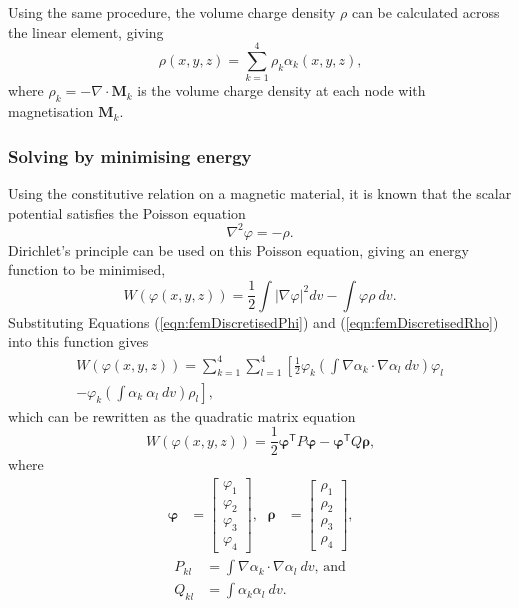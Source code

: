 Using the same procedure, the volume charge density \(\rho\) can be calculated across the linear element, giving
\begin{equation}\label{eqn:femDiscretisedRho}
    \rho\left(x,y,z\right) = \sum_{k = 1}^4 \rho_k \alpha_k\left(x,y,z\right) \text{,}
\end{equation}
where \(\rho_k = -\nabla \cdot \mathbf{M}_k\) is the volume charge density at each node with magnetisation \(\mathbf{M}_k\).

\subsubsection*{Solving by minimising energy}
Using the constitutive relation on a magnetic material, it is known that the scalar potential satisfies the Poisson equation
\begin{equation}
    \nabla ^2 \varphi = -\rho \text{.}
\end{equation}
Dirichlet's principle can be used on this Poisson equation, giving an energy function to be minimised,
\begin{equation}
    W\left(\varphi\left(x,y,z\right)\right) = \frac{1}{2} \int \left| \nabla \varphi \right|^2 dv - \int \varphi \rho \ dv \text{.}
\end{equation}
Substituting Equations (\ref{eqn:femDiscretisedPhi}) and (\ref{eqn:femDiscretisedRho}) into this function gives
\begin{align}
    W\left(\varphi\left(x,y,z\right)\right) = \sum_{k = 1}^4 \sum_{l = 1}^4 \left[ \frac{1}{2} \varphi_k \left( \int \nabla \alpha_k \cdot \nabla \alpha_l \ dv \right) \varphi_l \right. \nonumber \\
    \left. - \varphi_k \left( \int \alpha_k \ \alpha_l \ dv \right) \rho_l \right] \text{,}
\end{align}
which can be rewritten as the quadratic matrix equation
\begin{equation}\label{eqn:femQuadMatEqn}
    W\left(\varphi\left(x,y,z\right)\right) = \frac{1}{2}\bm{\varphi}^\mathsf{T} P \bm{\varphi} - \bm{\varphi}^\mathsf{T} Q \bm{\rho} \text{,}
\end{equation}
where
\begin{align*}
    \bm{\varphi} &= \begin{bmatrix} \varphi_1 \\ \varphi_2 \\ \varphi_3 \\ \varphi_4 \end{bmatrix} \text{,} &
    \bm{\rho} &= \begin{bmatrix} \rho_1 \\ \rho_2 \\ \rho_3 \\ \rho_4 \end{bmatrix} \text{,}
\end{align*}
\begin{align*}
    P_{kl} &= \int \nabla \alpha_k \cdot \nabla \alpha_l \ dv \text{, and} \\
    Q_{kl} &= \int \alpha_k \alpha_l \ dv \text{.}
\end{align*}

